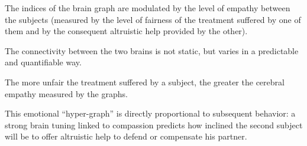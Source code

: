 \documentclass[10pt, letterpaper]{report}
\begin{document}
The indices of the brain graph are modulated by the level of empathy between the subjects (measured by the level of fairness of the treatment suffered by one of them and by the consequent altruistic help provided by the other).

\begin{boxobservation}{}{}
      The connectivity between the two brains is not static, but varies in a predictable and quantifiable way.
\end{boxobservation}
The more unfair the treatment suffered by a subject, the greater the cerebral empathy measured by the graphs.

This emotional ``hyper-graph'' is directly proportional to subsequent behavior: a strong brain tuning linked to compassion predicts how inclined the second subject will be to offer altruistic help to defend or compensate his partner.
\end{document}
